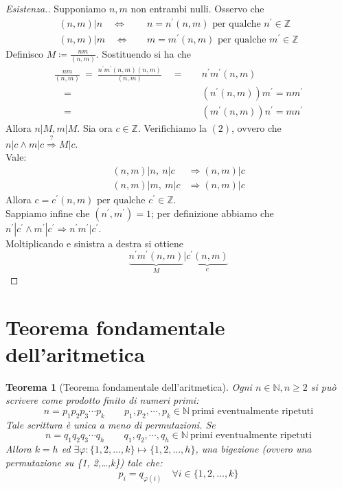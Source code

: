 \documentclass[12pt,twoside]{article}
\newcommand{\N}{\mathbb{N}}
\newcommand{\Z}{\mathbb{Z}}
\newcommand{\sesolose}{\Leftrightarrow}
\newcommand{\implica}{\Longrightarrow}
\newcommand{\pr}{\prime}
\newcommand{\pq}{\text{ per qualche }}
\renewcommand\qedsymbol{$\blacksquare$}
\newtheorem{theorem}{Teorema}
\begin{document}
\renewcommand\qedsymbol{$\blacksquare$}
\begin{proof}[Esistenza.]
Supponiamo $n, m$ non entrambi nulli. Osservo che
\begin{align*}
(n, m)|n \quad\sesolose&\quad n = n^{\pr}(n,m) \pq n^{\pr}\in\Z \\
(n, m)|m \quad\sesolose&\quad m = m^{\pr}(n,m) \pq m^{\pr}\in\Z
\end{align*}
Definisco $\displaystyle M \coloneqq \frac{nm}{(n, m)}$. Sostituendo si ha che
\begin{align*}
\frac{nm}{(n, m)}\ = \ \frac{n^{\pr}m^{\pr}(n, m)(n, m)}{(n, m)} \quad=&\quad n^{\pr}m^{\pr}(n,m) \\
\quad=&\quad (n^{\pr}(n, m))m^{\pr} = nm^{\pr} \\
\quad=&\quad (m^{\pr}(n,m))n^{\pr} = mn^{\pr}
\end{align*}
Allora $n | M, m | M$. Sia ora $c \in \Z$. Verifichiamo la $(2)$, ovvero che $n | c \land m | c \stackrel{?}{\implica} M | c$.
\\ Vale:
\begin{align*}
(n, m) | n,\ n|c &\implica (n,m)|c \\
(n, m) | m,\ m|c &\implica (n,m)|c 
\end{align*}
Allora $c = c^{\pr}(n, m) \pq c^{\pr} \in \Z$.
\\Sappiamo infine che $(n^{\pr}, m^{\pr}) = 1$; per definizione abbiamo che $n^{\pr} | c^{\pr} \land m^{\pr} | c^{\pr} \implica n^{\pr}m^{\pr} | c^{\pr}$.
\\Moltiplicando e sinistra a destra si ottiene
$$ \underbrace{n^{\pr}m^{\pr}(n,m)}_M | \underbrace{c^{\pr}(n,m)}_c$$
\end{proof}

\section{Teorema fondamentale dell'aritmetica}
\begin{theorem}[Teorema fondamentale dell'aritmetica]
Ogni $n \in \N, n \ge 2$ si può scrivere come prodotto finito di numeri primi:
$$ n = p_1 p_2 p_3 \cdots p_k\qquad p_1, p_2, \cdots, p_k \in \N \ \text{primi eventualmente ripetuti}$$
Tale scrittura è unica a meno di permutazioni. Se
$$ n = q_1 q_2 q_3 \cdots q_h\qquad q_1, q_2, \cdots, q_h \in \N \ \text{primi eventualmente ripetuti}$$
Allora $k = h$ ed $\exists \varphi : \{1, 2,\ldots ,k\} \mapsto \{1, 2, \ldots , h\}$, una bigezione (ovvero una permutazione su \{1, 2,\ldots ,k\}) tale che:
$$ p_i = q_{\varphi(i)}\quad \forall i \in \{1, 2,\ldots ,k\} $$
\end{theorem}
\end{document}
